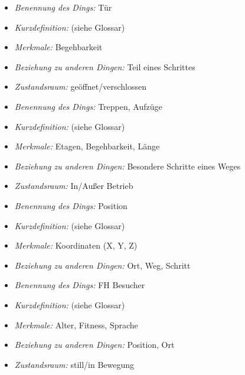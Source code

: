 \hrulefill

\begin{itemize}
\item \emph{Benennung des Dings:} Tür
\item \emph{Kurzdefinition:} (siehe Glossar)
\item \emph{Merkmale:} Begehbarkeit
\item \emph{Beziehung zu anderen Dingen:} Teil eines Schrittes
\item \emph{Zustandsraum:} geöffnet/verschlossen
\end{itemize}

\hrulefill

\begin{itemize}
\item \emph{Benennung des Dings:} Treppen, Aufzüge
\item \emph{Kurzdefinition:} (siehe Glossar)
\item \emph{Merkmale:} Etagen, Begehbarkeit, Länge
\item \emph{Beziehung zu anderen Dingen:} Besondere Schritte eines Weges
\item \emph{Zustandsraum:} In/Außer Betrieb
\end{itemize}

\hrulefill

\begin{itemize}
\item \emph{Benennung des Dings:} Position
\item \emph{Kurzdefinition:} (siehe Glossar)
\item \emph{Merkmale:} Koordinaten (X, Y, Z)
\item \emph{Beziehung zu anderen Dingen:} Ort, Weg, Schritt
\end{itemize}


\hrulefill

\begin{itemize}
\item \emph{Benennung des Dings:} FH Besucher
\item \emph{Kurzdefinition:} (siehe Glossar)
\item \emph{Merkmale:} Alter, Fitness, Sprache
\item \emph{Beziehung zu anderen Dingen:} Position, Ort
\item \emph{Zustandsraum:} still/in Bewegung
\end{itemize}
